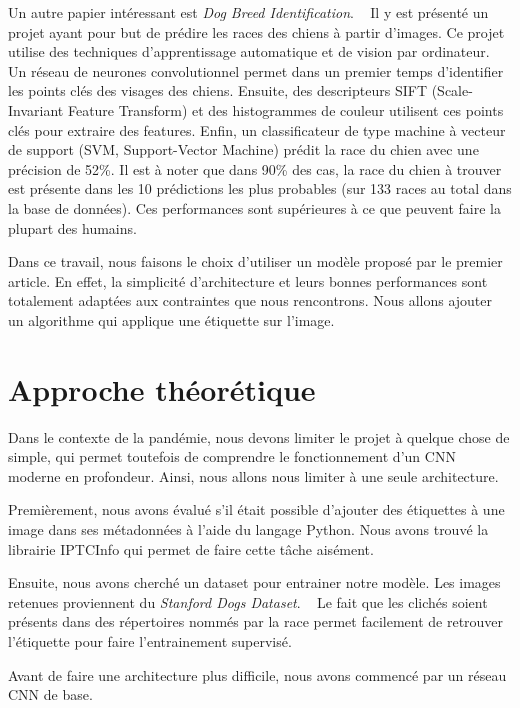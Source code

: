 \documentclass{article}
\begin{document}
Un autre papier intéressant est \textit{Dog Breed Identification}. ~\cite{output} Il 
y est présenté un projet ayant pour but de prédire les races des chiens à partir
d’images. Ce projet utilise des techniques d’apprentissage automatique et de vision
par ordinateur. Un réseau de neurones convolutionnel permet dans un premier
temps d’identifier les points clés des visages des chiens. Ensuite, des descripteurs
SIFT (Scale-Invariant Feature Transform) et des histogrammes de couleur utilisent 
ces points clés pour extraire des features. Enfin, un classificateur de type machine 
à vecteur de support (SVM, Support-Vector Machine) prédit la race du chien avec
une précision de 52\%. Il est à noter que dans 90\% des cas, la race du chien à 
trouver est présente dans les 10 prédictions les plus probables (sur 133 races au
total dans la base de données). Ces performances sont supérieures à ce que
peuvent faire la plupart des humains.

Dans ce travail, nous faisons le choix d'utiliser un modèle proposé par le premier
article. En effet, la simplicité d’architecture et leurs bonnes performances sont
totalement adaptées aux contraintes que nous rencontrons. Nous allons ajouter un
algorithme qui applique une étiquette sur l'image.

\section{Approche théorétique}
Dans le contexte de la pandémie, nous devons limiter le projet à quelque chose de
simple, qui permet toutefois de comprendre le fonctionnement d'un CNN moderne en profondeur. Ainsi, nous allons nous limiter à une seule architecture.

Premièrement, nous avons évalué s'il était possible d'ajouter des étiquettes à une
image dans ses métadonnées à l'aide du langage Python. Nous avons trouvé la
librairie IPTCInfo qui permet de faire cette tâche aisément.

Ensuite, nous avons cherché un dataset pour entrainer notre modèle. Les images
retenues proviennent du \textit{Stanford Dogs Dataset}. 
~\cite{KhoslaYaoJayadevaprakashFeiFei_FGVC2011} Le fait que les clichés soient
présents dans des répertoires nommés par la race permet facilement de retrouver
l'étiquette pour faire l'entrainement supervisé.

Avant de faire une architecture plus difficile, nous avons commencé par un réseau CNN de base.
\end{document}
